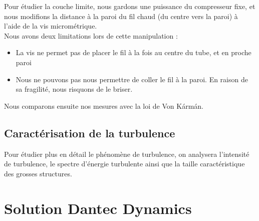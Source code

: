 \documentclass[12pt, a4paper]{report}
\begin{document}
	Pour étudier la couche limite, nous gardons une puissance du compresseur fixe, et nous modifions la distance à la paroi du fil chaud (du centre vers la paroi) à l'aide de la vis micrométrique. \\
	
	\noindent Nous avons deux limitations lors de cette manipulation :
	\begin{itemize}
		\item La vis ne permet pas de placer le fil à la fois au centre du tube, et en proche paroi
		\item Nous ne pouvons pas nous permettre de coller le fil à la paroi. En raison de sa fragilité, nous risquons de le briser.
	\end{itemize}
	
	\noindent Nous comparons ensuite nos mesures avec la loi de Von Kármán.
	
	\subsection{Caractérisation de la turbulence}
	Pour étudier plus en détail le phénomène de turbulence, on analysera l'intensité de turbulence, le spectre d'énergie turbulente ainsi que la taille caractéristique des grosses structures. 
	
	\section{Solution Dantec Dynamics}
		
%		
%		
%		
%		
%		
	
\end{document}
